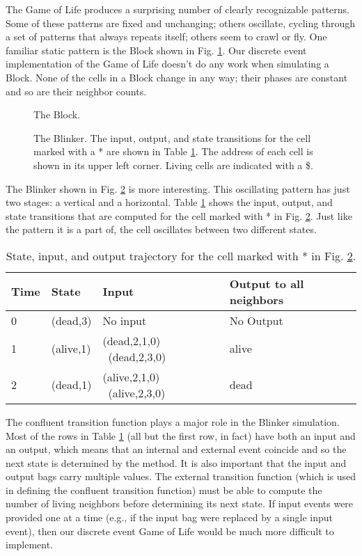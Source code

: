 The Game of Life produces a surprising number of clearly recognizable patterns. Some of these patterns are fixed and unchanging; others oscillate, cycling through a set of patterns that always repeats itself; others seem to crawl or fly. One familiar static pattern is the Block shown in Fig. \ref{fig:gol_block}.
Our discrete event implementation of the Game of Life doesn't do any work when simulating a Block. None of the cells in a Block change in any way; their phases are constant and so are their neighbor counts. 
\begin{figure}[ht]
\centering
{}
\caption{The Block.}
\label{fig:gol_block}
\end{figure}
\begin{figure}[ht]
\centering
{}
\caption{The Blinker. The input, output, and state transitions for the cell marked with a * are shown in Table \ref{tab:blinker_cell_activity}. The address of each cell is shown in its upper left corner. Living cells are indicated with a \$.}
\label{fig:gol_blinker}
\end{figure}
The Blinker shown in Fig. \ref{fig:gol_blinker} is more interesting. This oscillating pattern has just two stages: a vertical and a horizontal. 
Table \ref{tab:blinker_cell_activity} shows the input, output, and state transitions that are computed for the cell marked with * in Fig. \ref{fig:gol_blinker}. Just like the pattern it is a part of, the cell oscillates between two different states.
\begin{table}[ht]
\centering
\begin{tabular}{|l|l|l|l|}
\hline Time & State      & Input & Output to all neighbors\\ \hline
0 & (dead,3) & No input & No Output \\ \hline 
1 & (alive,1) & (dead,2,1,0) \ (dead,2,3,0) & alive \\ \hline 
2 & (dead,1) & (alive,2,1,0) \ (alive,2,3,0) & dead \\ \hline
\end{tabular}
\caption{State, input, and output trajectory for the cell marked with * in Fig. \ref{fig:gol_blinker}.}
\label{tab:blinker_cell_activity}
\end{table}

The confluent transition function plays a major role in the Blinker simulation. Most of the rows in Table \ref{tab:blinker_cell_activity} (all but the first row, in fact) have both an input and an output, which means that an internal and external event coincide and so the next state is determined by the  method. It is also important that the input and output bags carry multiple values. The external transition function (which is used in defining the confluent transition function) must be able to compute the number of living neighbors before determining its next state. If input events were provided one at a time (e.g., if the input bag were replaced by a single input event), then our discrete event Game of Life would be much more difficult to implement.
